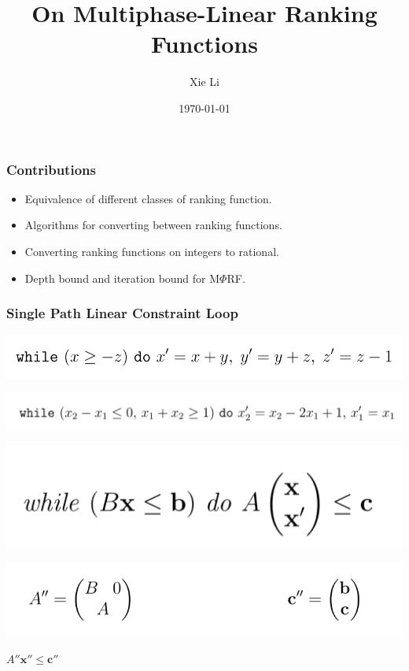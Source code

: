 \documentclass[11pt]{beamer}
\title{On Multiphase-Linear Ranking Functions}
\date{\today}
\author{Xie Li}
\begin{document}
\maketitle

\begin{frame}\frametitle{Contributions}
\begin{itemize}
\item Equivalence of different classes of ranking function.

\item Algorithms for converting between ranking functions.

\item Converting ranking functions on integers to rational.

\item Depth bound and iteration bound for M$\Phi$RF.

\end{itemize}
\end{frame}

\begin{frame}\frametitle{Single Path Linear Constraint Loop}
\begin{example}
\begin{center}

\includegraphics[scale = 0.4]{loopExample.png}

\includegraphics[scale = 0.4]{loopExample1.png}
\end{center}

\end{example}

\begin{definition}[SLC]
\includegraphics[scale = 0.4]{1.png}


\end{definition}
\begin{center}
\includegraphics[scale = 0.35]{2.png}

$A''\textbf{x}'' \le \textbf{c}''$
\end{center}


\end{frame}
\end{document}
